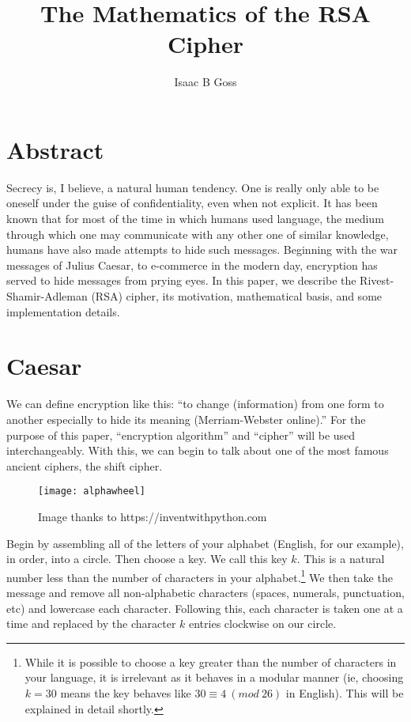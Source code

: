 \documentclass{article}
\begin{document}
\title{The Mathematics of the RSA Cipher}
\author{Isaac B Goss}
\maketitle

    \section{Abstract}
        Secrecy is, I believe, a natural human tendency.  One is really only able to be oneself under the guise of confidentiality, even when not explicit.  %
        It has been known that for most of the time in which humans used language, the medium through which one may communicate with any other one of similar knowledge, humans have also made attempts to hide such messages.
        Beginning with the war messages of Julius Caesar, to e-commerce in the modern day, encryption has served to hide messages from prying eyes.
        In this paper, we describe the Rivest-Shamir-Adleman (RSA) cipher, its motivation, mathematical basis, and some implementation details.
    \newpage
    \section{Caesar}
        We can define encryption like this: ``to change (information) from one form to another especially to hide its meaning (Merriam-Webster online).''  
        For the purpose of this paper, ``encryption algorithm'' and ``cipher'' will be used interchangeably.  
        With this, we can begin to talk about one of the most famous ancient ciphers, the shift cipher.  
        
        \begin{figure}[h]
        	\centering
        	\texttt{[image: alphawheel]}
        	\caption{Image thanks to https://inventwithpython.com}
        \end{figure}
        Begin by assembling all of the letters of your alphabet (English, for our example), in order, into a circle.  Then choose a key.  
        We call this key $k$.  
        This is a natural number less than the number of characters in your alphabet.\footnote{While it is possible to choose a key greater than the number of characters in your language, it is irrelevant as it behaves in a modular manner (ie, choosing $k=30$ means the key behaves like $30\equiv4\ (mod\ 26)$ in English). This will be explained in detail shortly.}
        We then take the message and remove all non-alphabetic characters (spaces, numerals, punctuation, etc) and lowercase each character.
        Following this, each character is taken one at a time and replaced by the character $k$ entries clockwise on our circle.\cite{trappewash}
        
\end{document}
